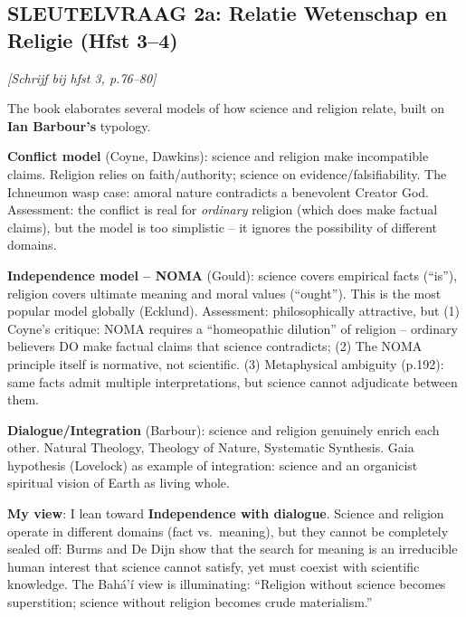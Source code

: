 \documentclass[a4paper,10pt]{article}
\begin{document}
\vspace{3pt}

\begin{answerbox}
\subsection{SLEUTELVRAAG 2a: Relatie Wetenschap en Religie (Hfst 3--4)}

\textit{[Schrijf bij hfst 3, p.76--80]}

The book elaborates several models of how science and religion relate, built on \textbf{Ian Barbour's} typology.

\textbf{Conflict model} (Coyne, Dawkins): science and religion make incompatible claims. Religion relies on faith/authority; science on evidence/falsifiability. The Ichneumon wasp case: amoral nature contradicts a benevolent Creator God. Assessment: the conflict is real for \textit{ordinary} religion (which does make factual claims), but the model is too simplistic -- it ignores the possibility of different domains.

\textbf{Independence model -- NOMA} (Gould): science covers empirical facts (``is''), religion covers ultimate meaning and moral values (``ought''). This is the most popular model globally (Ecklund). Assessment: philosophically attractive, but (1) Coyne's critique: NOMA requires a ``homeopathic dilution'' of religion -- ordinary believers DO make factual claims that science contradicts; (2) The NOMA principle itself is normative, not scientific. (3) Metaphysical ambiguity (p.192): same facts admit multiple interpretations, but science cannot adjudicate between them.

\textbf{Dialogue/Integration} (Barbour): science and religion genuinely enrich each other. Natural Theology, Theology of Nature, Systematic Synthesis. Gaia hypothesis (Lovelock) as example of integration: science and an organicist spiritual vision of Earth as living whole.

\textbf{My view}: I lean toward \textbf{Independence with dialogue}. Science and religion operate in different domains (fact vs.\ meaning), but they cannot be completely sealed off: Burms and De Dijn show that the search for meaning is an irreducible human interest that science cannot satisfy, yet must coexist with scientific knowledge. The Bah\'a'\'i\xspace view is illuminating: ``Religion without science becomes superstition; science without religion becomes crude materialism.''
\end{answerbox}
\end{document}
